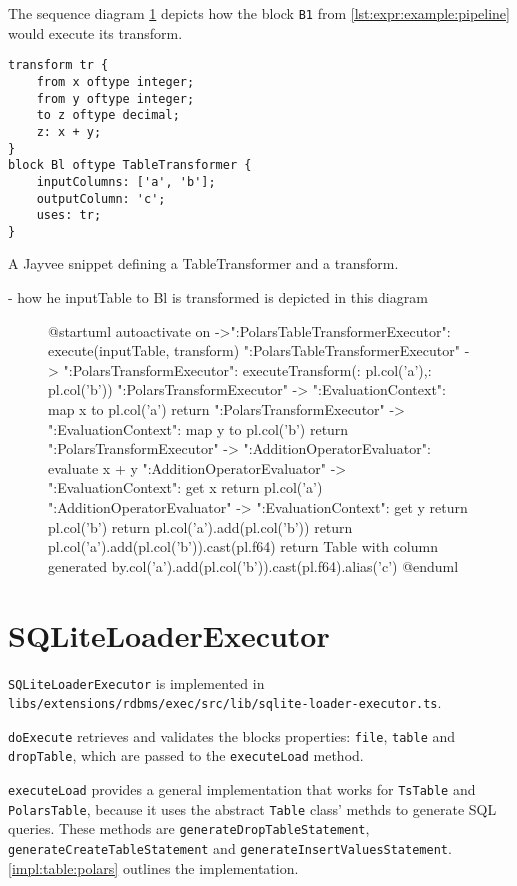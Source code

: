 The sequence diagram \ref{fig:uml:epr:example} depicts how the block \Verb|B1| from \ref{lst:expr:example:pipeline} would execute its transform.
\begin{listing}
	\begin{verbatim}
transform tr {
	from x oftype integer;
	from y oftype integer;
	to z oftype decimal;
	z: x + y;
}
block Bl oftype TableTransformer {
	inputColumns: ['a', 'b'];
	outputColumn: 'c';
	uses: tr;
}
	\end{verbatim}
	\caption{A Jayvee snippet defining a TableTransformer and a transform.}
	\label{lst:expr:example:pipeline}
\end{listing}
- how he inputTable to Bl is transformed is depicted in this diagram
\begin{figure}
	\begin{plantuml}
		@startuml
		autoactivate on
		->":PolarsTableTransformerExecutor": execute(inputTable, transform)
		":PolarsTableTransformerExecutor" -> ":PolarsTransformExecutor": executeTransform({\nx: pl.col('a'),\ny: pl.col('b')\n})
		":PolarsTransformExecutor" -> ":EvaluationContext": map x to pl.col('a')
		return
		":PolarsTransformExecutor" -> ":EvaluationContext": map y to pl.col('b')
		return
		":PolarsTransformExecutor" -> ":AdditionOperatorEvaluator": evaluate x + y
		":AdditionOperatorEvaluator" -> ":EvaluationContext": get x
		return pl.col('a')
		":AdditionOperatorEvaluator" -> ":EvaluationContext": get y
		return pl.col('b')
		return pl.col('a')\n.add(pl.col('b'))
		return pl.col('a')\n.add(pl.col('b'))\n.cast(pl.f64)
		return Table with column generated by\npl.col('a')\n.add(pl.col('b'))\n.cast(pl.f64)\n.alias('c')
		@enduml
	\end{plantuml}
	\caption{}
	\label{fig:uml:epr:example}
\end{figure}




\section{SQLiteLoaderExecutor}
\Verb|SQLiteLoaderExecutor| is implemented in \Verb|libs/extensions/rdbms/exec/src/lib/sqlite-loader-executor.ts|.

\Verb|doExecute| retrieves and validates the blocks properties: \Verb|file|, \Verb|table| and \Verb|dropTable|, which are passed to the \Verb|executeLoad| method.

\Verb|executeLoad| provides a general implementation that works for \Verb|TsTable| and \Verb|PolarsTable|, because it uses the abstract \Verb|Table| class' methds to generate \ac{SQL} queries.
These methods are \Verb|generateDropTableStatement|, \Verb|generateCreateTableStatement| and \Verb|generateInsertValuesStatement|.
\ref{impl:table:polars} outlines the implementation.

